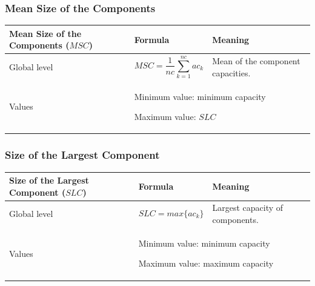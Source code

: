 \documentclass{article}
\begin{document}
\subsubsection{Mean Size of the Components}
\label{metric_MSC}
\begin{table}[H]
\begin{tabular}{|m{3.24cm}|m{4.4810004cm}m{7.924cm}|}
\hline
Mean Size of the Components ($MSC$) &
\multicolumn{1}{m{4.4810004cm}|}{Formula} &
Meaning\\\hline
Global level &
\multicolumn{1}{m{4.4810004cm}|}{\begin{equation*}
\mathit{MSC}=\frac{1}{\mathit{nc}}\sum
_{k=1}^{\mathit{nc}}{{\mathit{ac}}_{k}}
\end{equation*}
} &
Mean of the component capacities.

\\\hline
Values &
\multicolumn{2}{m{12.6050005cm}|}{Minimum value: minimum capacity

Maximum value:  $\mathit{SLC}$
}\\\hline
\end{tabular}
\end{table}


\subsubsection{Size of the Largest Component}
\label{metric_SLC}
\begin{table}[H]
\begin{tabular}{|m{3.24cm}|m{4.4810004cm}m{7.924cm}|}
\hline
Size of the Largest Component
($SLC$) &
\multicolumn{1}{m{4.4810004cm}|}{Formula} &
Meaning\\\hline
Global level &
\multicolumn{1}{m{4.4810004cm}|}{\begin{equation*}
\mathit{SLC}=\mathit{max}\{{\mathit{ac}}_{k}\}
\end{equation*}
} &
Largest capacity of components.

\\\hline
Values &
\multicolumn{2}{m{12.6050005cm}|}{Minimum value: minimum capacity

Maximum value: maximum capacity
}\\\hline
\end{tabular}
\end{table}
\end{document}

